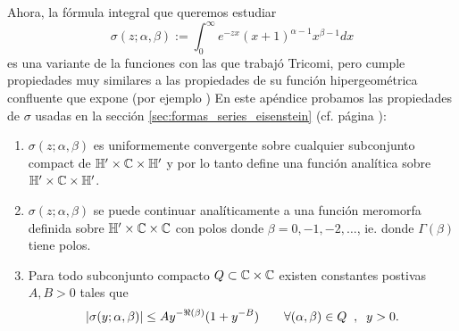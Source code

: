 \documentclass[../../tesis_maestria]{subfiles}
\begin{document}
Ahora, la f\'ormula integral que queremos estudiar
\[
  \sigma(z;\alpha,\beta):=\int_0^{\infty}e^{-zx}(x+1)^{\alpha-1}x^{\beta-1}dx
\]
es una variante de la funciones con las que trabaj\'o Tricomi, pero cumple propiedades muy
similares a las propiedades de su funci\'on hipergeom\'etrica confluente que expone (por
ejemplo \cite[\S2.3]{TricomiFHC}) En este ap\'endice probamos las propiedades de $\sigma$
usadas en la secci\'on \ref{sec:formas_series_eisenstein} (cf. p\'agina
\pageref{prop_func_hipergeo_conf}):

\begin{enumerate}[label=(\emph{\roman*})]%
  \label{prop_func_hipergeo_conf}
\item\label{lema:conv_unif_sigma} $\sigma(z;\alpha,\beta)$ es uniformemente convergente sobre
  cualquier subconjunto compact de $\mathbb{H}'\times\mathbb{C}\times\mathbb{H}'$ y por lo tanto define una funci\'on
  anal\'itica sobre $\mathbb{H}'\times\mathbb{C}\times\mathbb{H}'$.
  
\item\label{lema:cont_mero} $\sigma(z;\alpha,\beta)$ se puede continuar anal\'iticamente a
  una funci\'on meromorfa definida sobre $\mathbb{H}'\times\mathbb{C}\times\mathbb{C}$ con polos donde
  $\beta=0,-1,-2,\ldots$, ie. donde $\Gamma(\beta)$ tiene polos.

\item\label{lema:cota_sigma} Para todo subconjunto compacto $Q\subset\mathbb{C}\times\mathbb{C}$ existen
  constantes postivas $A,B>0$ tales que
  \[
    \left| \sigma(y;\alpha,\beta) \right| \leq Ay^{-\Re(\beta)}(1+y^{-B})
    \qquad\forall (\alpha,\beta)\in Q\;\;,\;\; y>0.
  \]
\end{enumerate}%
\end{document}
